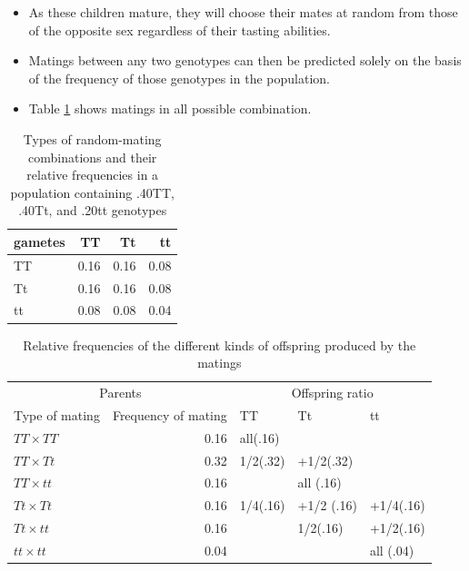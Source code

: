 \documentclass[11pt,dvipsnames,ignorenonframetext,aspectratio=169]{beamer}
\providecommand{\tightlist}{%
  \setlength{\itemsep}{0pt}\setlength{\parskip}{0pt}}
\begin{document}
\begin{frame}{}
\protect\hypertarget{section-4}{}

\begin{itemize}
\tightlist
\item
  As these children mature, they will choose their mates at random from
  those of the opposite sex regardless of their tasting abilities.
\item
  Matings between any two genotypes can then be predicted solely on the
  basis of the frequency of those genotypes in the population.
\item
  Table \ref{tab:random-mating-monogene-gene-freq} shows matings in all
  possible combination.
\end{itemize}

\begin{table}[t]

\caption{\label{tab:random-mating-monogene-gene-freq}Types of random-mating combinations and their relative frequencies in a population containing .40TT, .40Tt, and .20tt genotypes}
\centering
\begin{tabular}{lrrr}
\toprule
gametes & TT & Tt & tt\\
\midrule
TT & 0.16 & 0.16 & 0.08\\
Tt & 0.16 & 0.16 & 0.08\\
tt & 0.08 & 0.08 & 0.04\\
\bottomrule
\end{tabular}
\end{table}

\end{frame}

\begin{frame}{}
\protect\hypertarget{section-5}{}

\begin{table}[t]

\caption{\label{tab:unnamed-chunk-1}Relative frequencies of the different kinds of offspring produced by the matings}
\centering
\begin{tabular}{lrlll}
\toprule
\multicolumn{2}{c}{Parents} & \multicolumn{3}{c}{Offspring ratio} \\
\cmidrule(l{3pt}r{3pt}){1-2} \cmidrule(l{3pt}r{3pt}){3-5}
Type of mating & Frequency of mating & TT & Tt & tt\\
\midrule
\rowcolor{gray!6}  $TT \times TT$ & 0.16 & all(.16) &  & \\
$TT \times Tt$ & 0.32 & 1/2(.32) & +1/2(.32) & \\
\rowcolor{gray!6}  $TT \times tt$ & 0.16 &  & all (.16) & \\
$Tt \times Tt$ & 0.16 & 1/4(.16) & +1/2 (.16) & +1/4(.16)\\
\rowcolor{gray!6}  $Tt \times tt$ & 0.16 &  & 1/2(.16) & +1/2(.16)\\
\addlinespace
$tt \times tt$ & 0.04 &  &  & all (.04)\\
\bottomrule
\end{tabular}
\end{table}

\end{frame}
\end{document}
